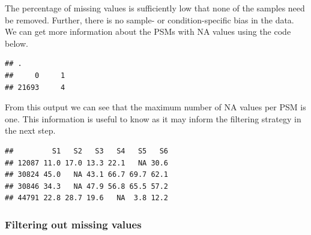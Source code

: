 \documentclass[9pt,a4paper,]{extarticle}
\newenvironment{Shaded}{\begin{snugshade}}{\end{snugshade}}
\newcommand{\DecValTok}[1]{\textcolor[rgb]{0.00,0.00,0.81}{#1}}
\newcommand{\DocumentationTok}[1]{\textcolor[rgb]{0.56,0.35,0.01}{\textbf{\textit{#1}}}}
\newcommand{\FunctionTok}[1]{\textcolor[rgb]{0.00,0.00,0.00}{#1}}
\newcommand{\NormalTok}[1]{#1}
\newcommand{\OtherTok}[1]{\textcolor[rgb]{0.56,0.35,0.01}{#1}}
\newcommand{\SpecialCharTok}[1]{\textcolor[rgb]{0.00,0.00,0.00}{#1}}
\newcommand{\StringTok}[1]{\textcolor[rgb]{0.31,0.60,0.02}{#1}}
\begin{document}
The percentage of missing values is sufficiently low that none of the samples
need be removed. Further, there is no sample- or condition-specific bias in the
data. We can get more information about the PSMs with NA values using the code
below.

\begin{Shaded}
\end{Shaded}

\begin{verbatim}
## .
##     0     1 
## 21693     4
\end{verbatim}

From this output we can see that the maximum number of NA values per PSM is one.
This information is useful to know as it may inform the filtering strategy in the
next step.

\begin{Shaded}
\end{Shaded}

\begin{verbatim}
##         S1   S2   S3   S4   S5   S6
## 12087 11.0 17.0 13.3 22.1   NA 30.6
## 30824 45.0   NA 43.1 66.7 69.7 62.1
## 30846 34.3   NA 47.9 56.8 65.5 57.2
## 44791 22.8 28.7 19.6   NA  3.8 12.2
\end{verbatim}

\hypertarget{filtering-out-missing-values}{%
\subsubsection{Filtering out missing values}\label{filtering-out-missing-values}}
\end{document}
